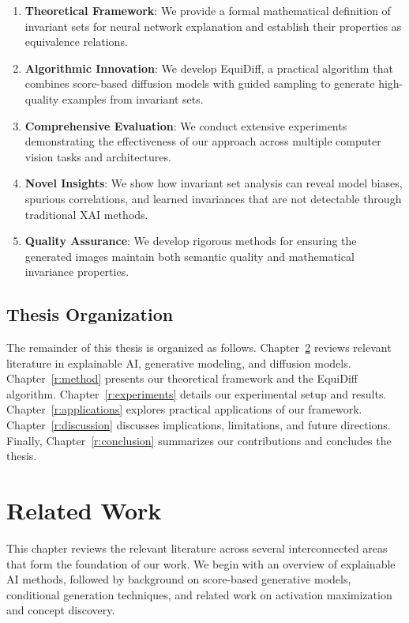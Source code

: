 \documentclass[licencjacka,en]{pracamgr}
\newcommand{\method}[1]{EquiDiff}  %
\begin{document}
\begin{enumerate}
\item \textbf{Theoretical Framework}: We provide a formal mathematical definition of invariant sets for neural network explanation and establish their properties as equivalence relations.

\item \textbf{Algorithmic Innovation}: We develop \method{}, a practical algorithm that combines score-based diffusion models with guided sampling to generate high-quality examples from invariant sets.

\item \textbf{Comprehensive Evaluation}: We conduct extensive experiments demonstrating the effectiveness of our approach across multiple computer vision tasks and architectures.

\item \textbf{Novel Insights}: We show how invariant set analysis can reveal model biases, spurious correlations, and learned invariances that are not detectable through traditional XAI methods.

\item \textbf{Quality Assurance}: We develop rigorous methods for ensuring the generated images maintain both semantic quality and mathematical invariance properties.
\end{enumerate}

\section{Thesis Organization}

The remainder of this thesis is organized as follows. Chapter~\ref{r:related_work} reviews relevant literature in explainable AI, generative modeling, and diffusion models. Chapter~\ref{r:method} presents our theoretical framework and the \method{} algorithm. Chapter~\ref{r:experiments} details our experimental setup and results. Chapter~\ref{r:applications} explores practical applications of our framework. Chapter~\ref{r:discussion} discusses implications, limitations, and future directions. Finally, Chapter~\ref{r:conclusion} summarizes our contributions and concludes the thesis.

\chapter{Related Work}\label{r:related_work}

This chapter reviews the relevant literature across several interconnected areas that form the foundation of our work. We begin with an overview of explainable AI methods, followed by background on score-based generative models, conditional generation techniques, and related work on activation maximization and concept discovery.
\end{document}
